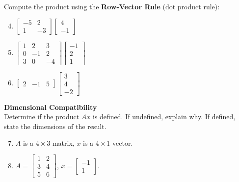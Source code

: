\documentclass[12pt]{article}
\begin{document}
Compute the product using the \textbf{Row-Vector Rule} (dot product rule):
\begin{enumerate}
\setcounter{enumi}{3}
    \item $\begin{bmatrix} -5 & 2 \\ 1 & -3 \end{bmatrix} \begin{bmatrix} 4 \\ -1 \end{bmatrix}$
    \item $\begin{bmatrix} 1 & 2 & 3 \\ 0 & -1 & 2 \\ 3 & 0 & -4 \end{bmatrix} \begin{bmatrix} -1 \\ 2 \\ 1 \end{bmatrix}$
    \item $\begin{bmatrix} 2 & -1 & 5 \end{bmatrix} \begin{bmatrix} 3 \\ 4 \\ -2 \end{bmatrix}$
\end{enumerate}

\textbf{Dimensional Compatibility} \\
Determine if the product $Ax$ is defined. If undefined, explain why. If defined, state the dimensions of the result.
\begin{enumerate}
\setcounter{enumi}{6}
    \item $A$ is a $4 \times 3$ matrix, $x$ is a $4 \times 1$ vector.
    \item $A = \begin{bmatrix} 1 & 2 \\ 3 & 4 \\ 5 & 6 \end{bmatrix}$, $x = \begin{bmatrix} -1 \\ 1 \end{bmatrix}$.
\end{enumerate}
\end{document}
